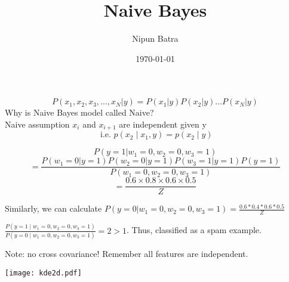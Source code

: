 \documentclass{beamer}
\title{Naive Bayes}
\date{\today}
\author{Nipun Batra}
\institute{IIT Gandhinagar}
\begin{document}
  \maketitle


\begin{frame}\begin{equation*}
        P(x_{1},x_{2},x_{3},\dots,x_{N} \vert y) = P(x_{1}|y) P(x_{2}|y) \dots P(x_{N}|y)
    \end{equation*}
    \pause Why is Naive Bayes model called Naive? \\

    \pause Naive assumption $x_{i}$ and $x_{i+1}$ are independent given y
    \[
    \text { i.e. }  p\left(x_{2} \mid x_{1}, y\right)=p\left(x_{2} \mid y\right)
    \]

\end{frame}

\begin{frame}$$
        P(y=1\vert w_{1}=0,w_{2} = 0,w_{3}=1) 
$$
$$ = \frac{P(w_{1}=0|y=1) P(w_{2}=0|y=1) P(w_{3}=1|y=1) P(y=1)}{P(w_{1}=0, w_{2}=0, w_{3}=1)}
    $$
    $$ = \frac{0.6\times 0.8 \times 0.6 \times 0.5}{Z}
    $$
    
\pause Similarly, we can calculate $P(y=0\vert w_{1}=0,w_{2} = 0,w_{3}=1) = \frac{0.6*0.4*0.6*0.5}{Z} $

\pause $\frac{P\left(y=1 \mid w_{1}=0, w_{2}=0, w_{3}=1\right)}{P\left(y=0 \mid w_{1}=0, w_{2}=0, w_{3}=1\right)} = 2 > 1$. Thus, classified as a spam example.
    
\end{frame}

\begin{frame}Note: no cross covariance! Remember all features are independent.

    \texttt{[image: kde2d.pdf]}
\end{frame}
\end{document}
